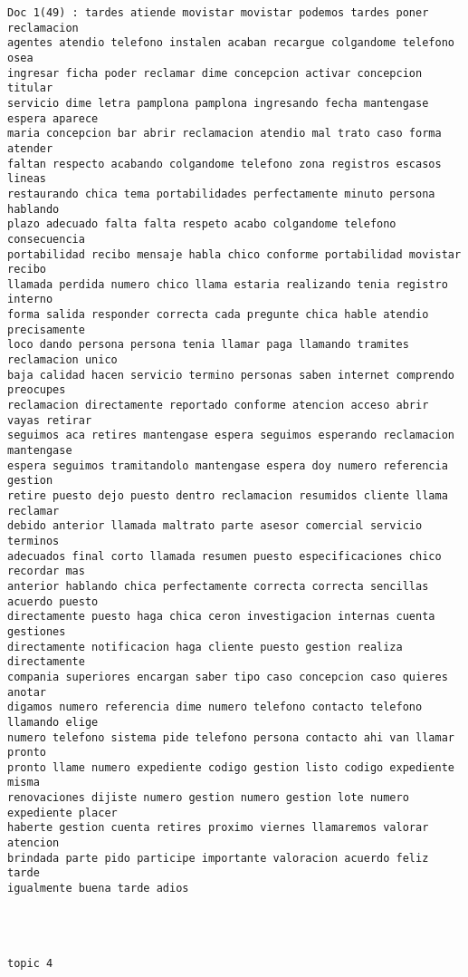 \begin{Verbatim}[commandchars=\\\{\}]
Doc 1(49) : tardes atiende movistar movistar podemos tardes poner reclamacion
agentes atendio telefono instalen acaban recargue colgandome telefono osea
ingresar ficha poder reclamar dime concepcion activar concepcion titular
servicio dime letra pamplona pamplona ingresando fecha mantengase espera aparece
maria concepcion bar abrir reclamacion atendio mal trato caso forma atender
faltan respecto acabando colgandome telefono zona registros escasos lineas
restaurando chica tema portabilidades perfectamente minuto persona hablando
plazo adecuado falta falta respeto acabo colgandome telefono consecuencia
portabilidad recibo mensaje habla chico conforme portabilidad movistar recibo
llamada perdida numero chico llama estaria realizando tenia registro interno
forma salida responder correcta cada pregunte chica hable atendio precisamente
loco dando persona persona tenia llamar paga llamando tramites reclamacion unico
baja calidad hacen servicio termino personas saben internet comprendo preocupes
reclamacion directamente reportado conforme atencion acceso abrir vayas retirar
seguimos aca retires mantengase espera seguimos esperando reclamacion mantengase
espera seguimos tramitandolo mantengase espera doy numero referencia gestion
retire puesto dejo puesto dentro reclamacion resumidos cliente llama reclamar
debido anterior llamada maltrato parte asesor comercial servicio terminos
adecuados final corto llamada resumen puesto especificaciones chico recordar mas
anterior hablando chica perfectamente correcta correcta sencillas acuerdo puesto
directamente puesto haga chica ceron investigacion internas cuenta gestiones
directamente notificacion haga cliente puesto gestion realiza directamente
compania superiores encargan saber tipo caso concepcion caso quieres anotar
digamos numero referencia dime numero telefono contacto telefono llamando elige
numero telefono sistema pide telefono persona contacto ahi van llamar pronto
pronto llame numero expediente codigo gestion listo codigo expediente misma
renovaciones dijiste numero gestion numero gestion lote numero expediente placer
haberte gestion cuenta retires proximo viernes llamaremos valorar atencion
brindada parte pido participe importante valoracion acuerdo feliz tarde
igualmente buena tarde adios




topic 4


\end{Verbatim}
